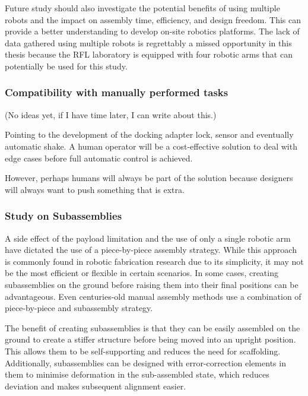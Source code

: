 \documentclass[11pt]{book}
\begin{document}
Future study should also investigate the potential benefits of using multiple robots and the impact on assembly time, efficiency, and design freedom. This can provide a better understanding to develop on-site robotics platforms. The lack of data gathered using multiple robots is regrettably a missed opportunity in this thesis because the RFL laboratory is equipped with four robotic arms that can potentially be used for this study. 

\subsubsection{Compatibility with manually performed tasks}

(No ideas yet, if I have time later, I can write about this.)

Pointing to the development of the docking adapter lock, sensor and eventually automatic shake. A human operator will be a cost-effective solution to deal with edge cases before full automatic control is achieved.

However, perhaps humans will always be part of the solution because designers will always want to push something that is extra.

\subsubsection{Study on Subassemblies}

A side effect of the payload limitation and the use of only a single robotic arm have dictated the use of a piece-by-piece assembly strategy. While this approach is commonly found in robotic fabrication research due to its simplicity, it may not be the most efficient or flexible in certain scenarios. In some cases, creating subassemblies on the ground before raising them into their final positions can be advantageous. Even centuries-old manual assembly methods use a combination of piece-by-piece and subassembly strategy.

The benefit of creating subassemblies is that they can be easily assembled on the ground to create a stiffer structure before being moved into an upright position. This allows them to be self-supporting and reduces the need for scaffolding. Additionally, subassemblies can be designed with error-correction elements in them to minimise deformation in the sub-assembled state, which reduces deviation and makes subsequent alignment easier.
\end{document}
